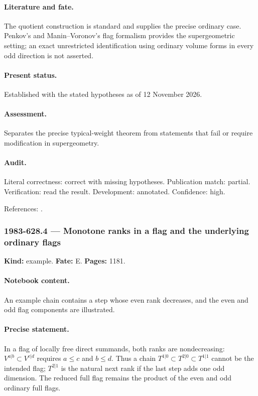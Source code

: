 \paragraph{Literature and fate.} The quotient construction is standard and supplies the precise ordinary case. Penkov’s and Manin–Voronov’s flag formalism provides the supergeometric setting; an exact unrestricted identification using ordinary volume forms in every odd direction is not asserted.

\paragraph{Present status.} Established with the stated hypotheses as of 12 November 2026.

\paragraph{Assessment.} Separates the precise typical-weight theorem from statements that fail or require modification in supergeometry.

\paragraph{Audit.} Literal correctness: correct with missing hypotheses. Publication match: partial. Verification: read the result. Development: annotated. Confidence: high.

\noindent References: \citep{penkov1988borel,maninvoronov1988supercell}.\par

\subsubsection{1983-628.4 --- Monotone ranks in a flag and the underlying ordinary flags}

\label{item:1983-628.4}

\noindent\textbf{Kind:} example. \textbf{Fate:} E. \textbf{Pages:} 1181.\par

\paragraph{Notebook content.} An example chain contains a step whose even rank decreases, and the even and odd flag components are illustrated.

\paragraph{Precise statement.} In a flag of locally free direct summands, both ranks are nondecreasing: \(V^{a|b}\subset V^{c|d}\) requires \(a\le c\) and \(b\le d\). Thus a chain \(T^{1|0}\subset T^{2|0}\subset T^{1|1}\) cannot be the intended flag; \(T^{2|1}\) is the natural next rank if the last step adds one odd dimension. The reduced full flag remains the product of the even and odd ordinary full flags.


